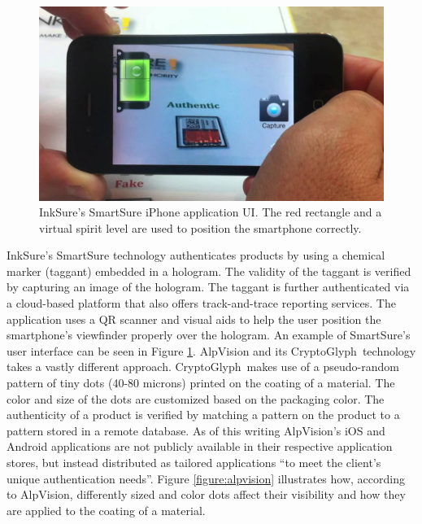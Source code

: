 \documentclass[thesis.tex]{subfiles}
\begin{document}
\begin{figure}[ht]
\centering \includegraphics[width=13.25cm]{images/existing_solutions/smartsure}
\caption{InkSure's SmartSure iPhone application UI. The red rectangle and a virtual spirit level are used to position the smartphone correctly. \cite{inksure} \label{figure:inksure}}
\end{figure}

InkSure's SmartSure technology authenticates products by using a chemical marker (taggant) embedded in a hologram. The validity of the taggant is verified by capturing an image of the hologram. The taggant is further authenticated via a cloud-based platform that also offers track-and-trace reporting services. The application uses a QR scanner and visual aids to help the user position the smartphone's viewfinder properly over the hologram. \cite{inksure} An example of SmartSure's user interface can be seen in Figure \ref{figure:inksure}. AlpVision and its CryptoGlyph\textregistered\ technology takes a vastly different approach. CryptoGlyph\textregistered\ makes use of a pseudo-random pattern of tiny dots (40-80 microns) printed on the coating of a material. The color and size of the dots are customized based on the packaging color. The authenticity of a product is verified by matching a pattern on the product to a pattern stored in a remote database. As of this writing AlpVision's iOS and Android applications are not publicly available in their respective application stores, but instead distributed as tailored applications ``to meet the client's unique authentication needs''. \cite{alpvision} Figure \ref{figure:alpvision} illustrates how, according to AlpVision, differently sized and color dots affect their visibility and how they are applied to the coating of a material.
\end{document}
